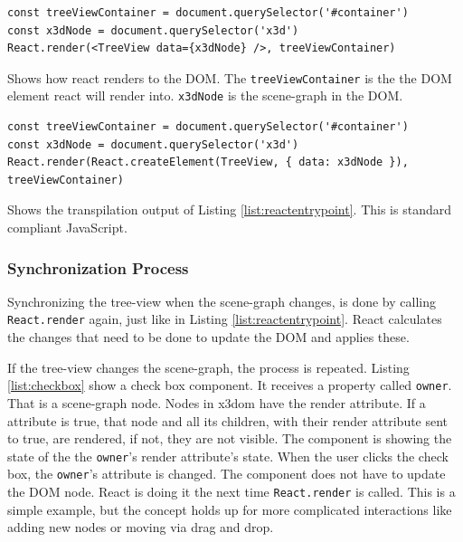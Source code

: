 \begin{listing}
  \begin{verbatim}
const treeViewContainer = document.querySelector('#container')
const x3dNode = document.querySelector('x3d')
React.render(<TreeView data={x3dNode} />, treeViewContainer)
  \end{verbatim}
  \caption{Shows how react renders to the \gls{DOM}. The \texttt{treeViewContainer} is the the \gls{DOM} element react will render into. \texttt{x3dNode} is the scene-graph in the \gls{DOM}.}
  \label{list:reactentrypoint}
\end{listing}

\begin{listing}
  \begin{verbatim}
const treeViewContainer = document.querySelector('#container')
const x3dNode = document.querySelector('x3d')
React.render(React.createElement(TreeView, { data: x3dNode }), treeViewContainer)
  \end{verbatim}
  \caption{Shows the transpilation output of Listing \ref{list:reactentrypoint}. This is standard compliant JavaScript.}
  \label{list:reacttranspiled}
\end{listing}

\subsubsection{Synchronization Process}
\label{synchronization-process}

Synchronizing the tree-view when the scene-graph changes, is done by calling
\texttt{React.render} again, just like in Listing \ref{list:reactentrypoint}. React
calculates the changes that need to be done to update the \gls{DOM} and applies these.

If the tree-view changes the scene-graph, the process is repeated. Listing
\ref{list:checkbox} show a check box component. It receives a property called
\texttt{owner}. That is a scene-graph node. Nodes in x3dom have the render
attribute. If a attribute is true, that node and all its children, with their render attribute sent to true, are rendered,
if not, they are not visible. The component is showing the state of the the
\texttt{owner}'s render attribute's state. When the user clicks the check box, the
\texttt{owner}'s attribute is changed. The component does not have to update the
\gls{DOM} node. React is doing it the next time \texttt{React.render} is called. This
is a simple example, but the concept holds up for more complicated interactions
like adding new nodes or moving via drag and drop.

